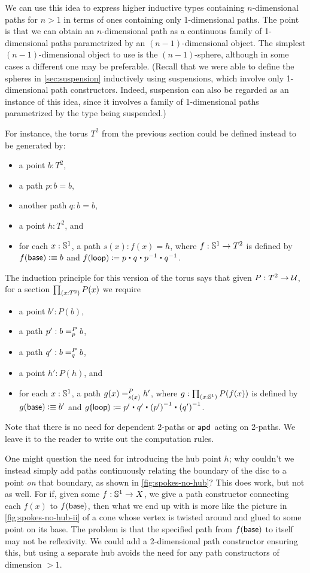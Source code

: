 We can use this idea to express higher inductive types containing $n$-dimensional paths for $n>1$ in terms of ones containing only 1-dimensional paths.
The point is that we can obtain an $n$-dimensional path as a continuous family of 1-dimensional paths parametrized by an $(n-1)$-dimensional object.
The simplest $(n-1)$-dimensional object to use is the $(n-1)$-sphere, although in some cases a different one may be preferable.
(Recall that we were able to define the spheres in \autoref{sec:suspension} inductively using suspensions, which involve only 1-dimensional path constructors.
Indeed, suspension can also be regarded as an instance of this idea, since it involves a family of 1-dimensional paths parametrized by the type being suspended.)

For instance, the torus $T^2$ from the previous section could be defined instead to be generated by:
\begin{itemize}
\item a point $b:T^2$,
\item a path $p:b=b$,
\item another path $q:b=b$,
\item a point $h:T^2$, and
\item for each $x:\Sn^1$, a path $s(x) : f(x)=h$, where $f:\Sn^1\to T^2$ is defined by $f(\base)\defeq b$ and $\ap f \lloop \defid p \ct q \ct \opp p \ct \opp q$.
\end{itemize}
The induction principle for this version of the torus says that given $P:T^2\to\type$, for a section $\prd{x:T^2} P(x)$ we require
\begin{itemize}
\item a point $b':P(b)$,
\item a path $p' : \dpath P p b b$,
\item a path $q' : \dpath P q b b$,
\item a point $h':P(h)$, and
\item for each $x:\Sn^1$, a path $\dpath {P}{s(x)}{g(x)}{h'}$, where $g:\prd{x:\Sn^1} P(f(x))$ is defined by $g(\base)\defeq b'$ and $\apd g \lloop \defid p' \ct q' \ct \opp{(p')} \ct \opp{(q')}$.
\end{itemize}
Note that there is no need for dependent 2-paths or $\apdfunc{}$ acting on 2-paths.
We leave it to the reader to write out the computation rules.

\begin{rmk}\label{rmk:spokes-no-hub}
One might question the need for introducing the hub point $h$; why couldn't we instead simply add paths continuously relating the boundary of the disc to a point \emph{on} that boundary, as shown in \autoref{fig:spokes-no-hub}?
This does work, but not as well.
For if, given some $f:\Sn^1 \to X$, we give a path constructor connecting each $f(x)$ to $f(\base)$, then what we end up with is more like the picture in \autoref{fig:spokes-no-hub-ii} of a cone whose vertex is twisted around and glued to some point on its base.
The problem is that the specified path from $f(\base)$ to itself may not be reflexivity.
We could add a 2-dimensional path constructor ensuring this, but using a separate hub avoids the need for any path constructors of dimension $>1$.
\end{rmk}

